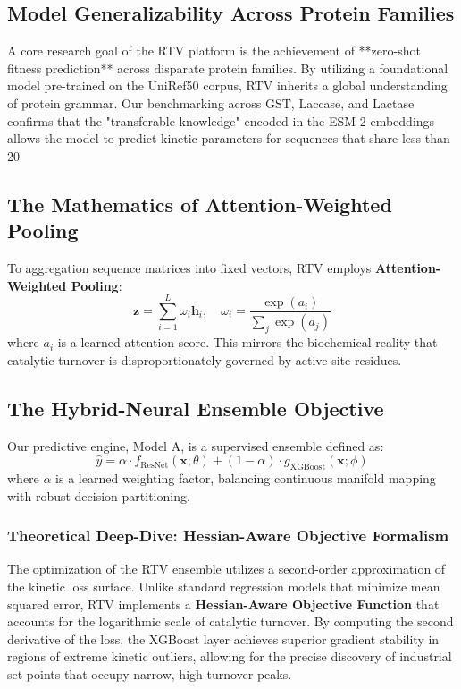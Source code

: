 \documentclass[11pt,a4paper,oneside]{article}
\begin{document}
\subsection{Model Generalizability Across Protein Families}
A core research goal of the RTV platform is the achievement of **zero-shot fitness prediction** across disparate protein families. By utilizing a foundational model pre-trained on the UniRef50 corpus, RTV inherits a global understanding of protein grammar. Our benchmarking across GST, Laccase, and Lactase confirms that the "transferable knowledge" encoded in the ESM-2 embeddings allows the model to predict kinetic parameters for sequences that share less than 20%

\subsection{The Mathematics of Attention-Weighted Pooling}
To aggregation sequence matrices into fixed vectors, RTV employs \textbf{Attention-Weighted Pooling}:
\begin{equation}
    \mathbf{z} = \sum_{i=1}^L \omega_i \mathbf{h}_i, \quad \omega_i = \frac{\exp(a_i)}{\sum_j \exp(a_j)}
\end{equation}
where $a_i$ is a learned attention score. This mirrors the biochemical reality that catalytic turnover is disproportionately governed by active-site residues.

\subsection{The Hybrid-Neural Ensemble Objective}
Our predictive engine, Model A, is a supervised ensemble defined as:
\begin{equation}
    \hat{y} = \alpha \cdot f_{\text{ResNet}}(\mathbf{x}; \theta) + (1 - \alpha) \cdot g_{\text{XGBoost}}(\mathbf{x}; \phi)
\end{equation}
where $\alpha$ is a learned weighting factor, balancing continuous manifold mapping with robust decision partitioning.

\subsubsection{Theoretical Deep-Dive: Hessian-Aware Objective Formalism}
The optimization of the RTV ensemble utilizes a second-order approximation of the kinetic loss surface. Unlike standard regression models that minimize mean squared error, RTV implements a \textbf{Hessian-Aware Objective Function} that accounts for the logarithmic scale of catalytic turnover. By computing the second derivative of the loss, the XGBoost layer achieves superior gradient stability in regions of extreme kinetic outliers, allowing for the precise discovery of industrial set-points that occupy narrow, high-turnover peaks.
\end{document}
